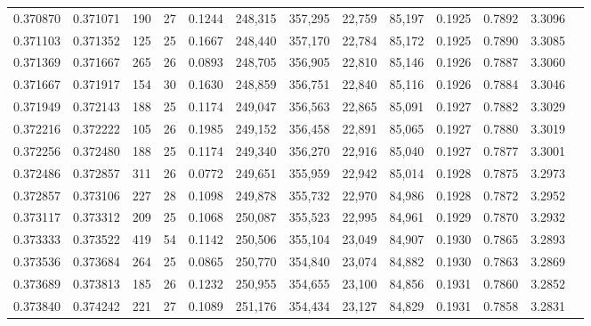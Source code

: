 \begin{tabular}{rrrrrrrrrrrrr}
0.370870 & 0.371071 &    190 &    27 &                                     0.1244 & 248,315 & 357,295 &  22,759 &  85,197 & 0.1925 & 0.7892 & 3.3096 \\
0.371103 & 0.371352 &    125 &    25 &                                     0.1667 & 248,440 & 357,170 &  22,784 &  85,172 & 0.1925 & 0.7890 & 3.3085 \\
0.371369 & 0.371667 &    265 &    26 &                                     0.0893 & 248,705 & 356,905 &  22,810 &  85,146 & 0.1926 & 0.7887 & 3.3060 \\
0.371667 & 0.371917 &    154 &    30 &                                     0.1630 & 248,859 & 356,751 &  22,840 &  85,116 & 0.1926 & 0.7884 & 3.3046 \\
0.371949 & 0.372143 &    188 &    25 &                                     0.1174 & 249,047 & 356,563 &  22,865 &  85,091 & 0.1927 & 0.7882 & 3.3029 \\
0.372216 & 0.372222 &    105 &    26 &                                     0.1985 & 249,152 & 356,458 &  22,891 &  85,065 & 0.1927 & 0.7880 & 3.3019 \\
0.372256 & 0.372480 &    188 &    25 &                                     0.1174 & 249,340 & 356,270 &  22,916 &  85,040 & 0.1927 & 0.7877 & 3.3001 \\
0.372486 & 0.372857 &    311 &    26 &                                     0.0772 & 249,651 & 355,959 &  22,942 &  85,014 & 0.1928 & 0.7875 & 3.2973 \\
0.372857 & 0.373106 &    227 &    28 &                                     0.1098 & 249,878 & 355,732 &  22,970 &  84,986 & 0.1928 & 0.7872 & 3.2952 \\
0.373117 & 0.373312 &    209 &    25 &                                     0.1068 & 250,087 & 355,523 &  22,995 &  84,961 & 0.1929 & 0.7870 & 3.2932 \\
0.373333 & 0.373522 &    419 &    54 &                                     0.1142 & 250,506 & 355,104 &  23,049 &  84,907 & 0.1930 & 0.7865 & 3.2893 \\
0.373536 & 0.373684 &    264 &    25 &                                     0.0865 & 250,770 & 354,840 &  23,074 &  84,882 & 0.1930 & 0.7863 & 3.2869 \\
0.373689 & 0.373813 &    185 &    26 &                                     0.1232 & 250,955 & 354,655 &  23,100 &  84,856 & 0.1931 & 0.7860 & 3.2852 \\
0.373840 & 0.374242 &    221 &    27 &                                     0.1089 & 251,176 & 354,434 &  23,127 &  84,829 & 0.1931 & 0.7858 & 3.2831 \\

\end{tabular}
